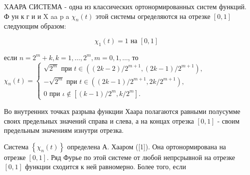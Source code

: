 \documentclass[10pt]{article}
\begin{document}
XААРА СИСТЕМА - одна из классических ортонормированных систем функций. Ф ун к г и и $\mathrm{X}$ aa p a $\chi_{n}(t)$ этой системы огределяются на отрезке $[0,1]$ следующим образом:



\[

\chi_{1}(t)=1 \text { на }[0,1]

\]



если $n=2^{m}+k, k=1, \ldots, 2^{m}, m=0,1, \ldots$, то $\chi_{n}(t)=\left\{\begin{array}{l}\sqrt{2^{m}} \text { при } t \in\left((2 k-2) / 2^{m+1},(2 k-1) / 2^{m+1}\right), \\ -\sqrt{2^{m}} \text { при } t \in\left((2 k-1) / 2^{m+1}, 2 k / 2^{m+1}\right), \\ 0 \text { при } \iota \notin\left[(k-1) / 2^{m}, k / 2^{m}\right] .\end{array}\right.$



Во внутренних точках разрыва функции Хаара полагаются равными полусумме своих предельных значений справа и слева, а на концах отрезка $[0,1]$ - своим предельным значениям изнутри отрезка.



Система $\left\{\chi_{n}(t)\right\}$ определена А. Хааром ([1]). Она ортонормирована на отрезке $[0,1]$. Ряд Фурье по этой системе от любой непрсрывной на отрезке $[0,1]$ функции сходится к ней равномерно. Более того, если
\end{document}
